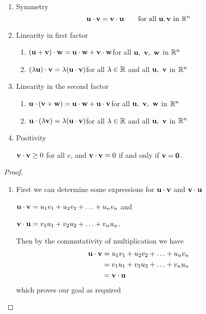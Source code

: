 \documentclass[10pt, a4paper]{article}
\begin{document}
\begin{proposition}
\phantom{}
\begin{enumerate}[label = (\roman*)]
    \item Symmetry
    \[
    \mathbf{u \cdot v = v \cdot u}\qquad\text{for all }\mathbf{u, v}\text{ in } \mathbb{R} ^ n
    \]
    \item Linearity in first factor
    \begin{enumerate}[label = (\alph*)]
        \item $(\mathbf{u} + \mathbf{v}) \cdot \mathbf{w} = \mathbf{u} \cdot \mathbf{w} + \mathbf{v} \cdot \mathbf{w}$\qquad for all $\mathbf{u,\ v,\ w}$ in $\mathbb{R} ^ n$
        \item $(\lambda\mathbf{u}) \cdot \mathbf{v} = \lambda(\mathbf{u} \cdot \mathbf{v})$\qquad for all $\lambda \in \mathbb{R}$ and all $\mathbf{u,\ v}$ in $\mathbb{R} ^ n$
    \end{enumerate}
    \item Linearity in the second factor
    \begin{enumerate}[label = (\alph*)]
        \item $\mathbf{u} \cdot (\mathbf{v} + \mathbf{w}) = \mathbf{u} \cdot \mathbf{w} + \mathbf{u} \cdot \mathbf{v}$\qquad for all $\mathbf{u,\ v,\ w}$ in $\mathbb{R} ^ n$
        \item $\mathbf{u} \cdot (\lambda\mathbf{v}) = \lambda(\mathbf{u} \cdot \mathbf{v})$\qquad for all $\lambda \in \mathbb{R}$ and all $\mathbf{u,\ v}$ in $\mathbb{R} ^ n$
    \end{enumerate}
    \item Positivity
    
    $\mathbf{v \cdot v} \geq 0$ for all $v$, and $\mathbf{v \cdot v} = 0$ if and only if $\mathbf{v = 0}$.
\end{enumerate}

\begin{proof}
    \phantom{}
    \begin{enumerate}[label = (\roman*)]
        \item
        First we can determine some expressions for $\mathbf{u\cdot v}$ and $\mathbf{v\cdot u}$
        
        $\mathbf{u\cdot v} = u_1 v_1 + u_2 v_2 + \dotsc + u_n v_n$ and

        $\mathbf{v\cdot u} = v_1 u_1 + v_2 u_2 + \dotsc + v_n u_n$.

        Then by the commutativity of multiplication we have
        \begin{align*}
            \mathbf{u\cdot v} &= u_1 v_1 + u_2 v_2 + \dotsc + u_n v_n \\
            &= v_1 u_1 + v_2 u_2 + \dotsc + v_n u_n \\
            &= \mathbf{v \cdot u}
        \end{align*}
        which proves our goal as required
        
    \end{enumerate}
\end{proof}
\end{proposition}
\end{document}
